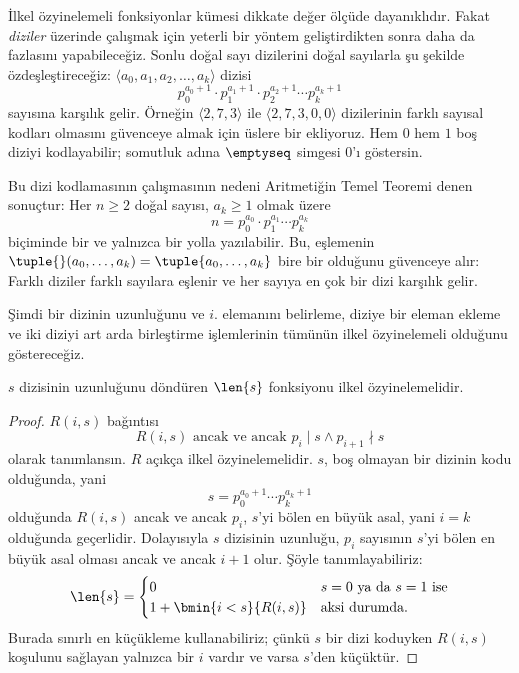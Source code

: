


İlkel özyinelemeli fonksiyonlar kümesi dikkate değer ölçüde dayanıklıdır.
Fakat \emph{diziler} üzerinde çalışmak için yeterli bir yöntem geliştirdikten
sonra daha da fazlasını yapabileceğiz. Sonlu doğal sayı dizilerini doğal
sayılarla şu şekilde özdeşleştireceğiz: $\langle a_0,a_1,a_2,\dots,a_k\rangle$
dizisi
\[
  p_0^{a_0+1}\cdot p_1^{a_1+1}\cdot p_2^{a_2+1}\cdots p_k^{a_k+1}
\]
sayısına karşılık gelir. Örneğin $\langle2,7,3\rangle$ ile
$\langle2,7,3,0,0\rangle$ dizilerinin farklı sayısal kodları olmasını
güvenceye almak için üslere bir ekliyoruz. Hem $0$ hem $1$ boş diziyi
kodlayabilir; somutluk adına $\emptyseq$ simgesi $0$'ı göstersin.

Bu dizi kodlamasının çalışmasının nedeni Aritmetiğin Temel Teoremi denen
sonuçtur: Her $n\geq2$ doğal sayısı, $a_k\geq1$ olmak üzere
\[
  n=p_0^{a_0}\cdot p_1^{a_1}\cdots p_k^{a_k}
\]
biçiminde bir ve yalnızca bir yolla yazılabilir. Bu, eşlemenin
$\tuple{}(a_0,\dots,a_k)=\tuple{a_0,\dots,a_k}$ bire bir olduğunu güvenceye
alır: Farklı diziler farklı sayılara eşlenir ve her sayıya en çok bir dizi
karşılık gelir.

Şimdi bir dizinin uzunluğunu ve $i$. elemanını belirleme, diziye bir eleman
ekleme ve iki diziyi art arda birleştirme işlemlerinin tümünün ilkel
özyinelemeli olduğunu göstereceğiz.

\begin{prop}
  $s$ dizisinin uzunluğunu döndüren $\len{s}$ fonksiyonu ilkel
  özyinelemelidir.
\end{prop}

\begin{proof}
  $R(i,s)$ bağıntısı
  \[
    R(i,s) \text{ ancak ve ancak } p_i\mid s\land p_{i+1}\nmid s
  \]
  olarak tanımlansın. $R$ açıkça ilkel özyinelemelidir. $s$, boş olmayan
  bir dizinin kodu olduğunda, yani
  \[
    s=p_0^{a_0+1}\cdots p_k^{a_k+1}
  \]
  olduğunda $R(i,s)$ ancak ve ancak $p_i$, $s$'yi bölen en büyük asal,
  yani $i=k$ olduğunda geçerlidir. Dolayısıyla $s$ dizisinin uzunluğu,
  $p_i$ sayısının $s$'yi bölen en büyük asal olması ancak ve ancak $i+1$
  olur. Şöyle tanımlayabiliriz:
  \[
    \len{s}=\begin{cases}
      0 & \text{$s=0$ ya da $s=1$ ise}\\
      1+\bmin{i<s}{R(i,s)} & \text{aksi durumda.}
    \end{cases}
  \]
  Burada sınırlı en küçükleme kullanabiliriz; çünkü $s$ bir dizi koduyken
  $R(i,s)$ koşulunu sağlayan yalnızca bir $i$ vardır ve varsa $s$'den
  küçüktür.
\end{proof}

